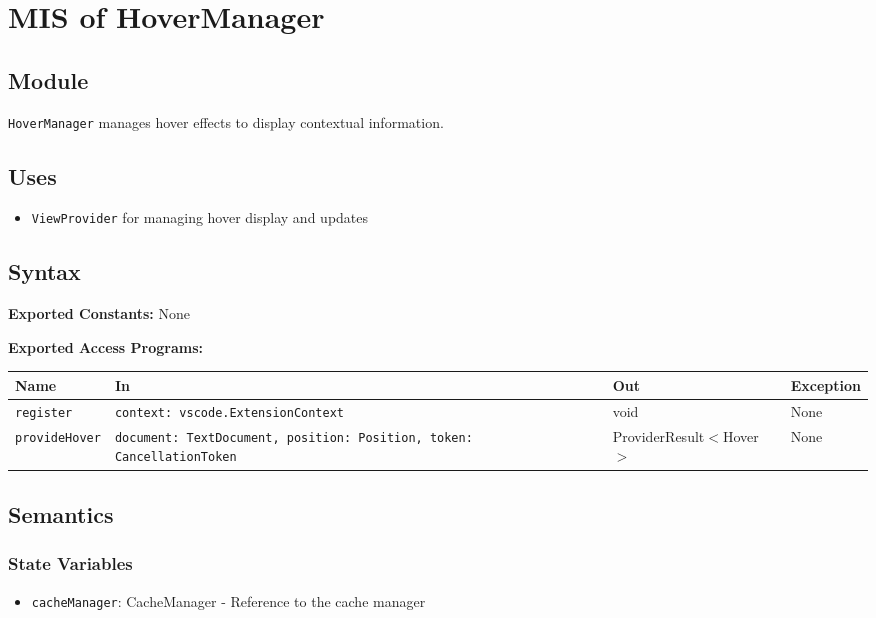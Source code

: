 \documentclass[12pt, titlepage]{article}
\begin{document}
\section{MIS of HoverManager}

\subsection{Module}
\texttt{HoverManager} manages hover effects to display contextual information.

\subsection{Uses}
\begin{itemize}
\item \texttt{ViewProvider} for managing hover display and updates
\end{itemize}

\subsection{Syntax}

\textbf{Exported Constants:} None

\textbf{Exported Access Programs:}\\
\begin{tabularx}{\linewidth}{|l|>{\raggedright\arraybackslash}X|l|l|}
  \hline
  \textbf{Name} & \textbf{In} & \textbf{Out} & \textbf{Exception} \\
  \hline
  \texttt{register} & \texttt{context: vscode.ExtensionContext} & void & None \\ \hline
  \texttt{provideHover} & \texttt{document: TextDocument, position: Position, token: CancellationToken} & ProviderResult$<$Hover$>$ & None \\
  \hline
\end{tabularx}

\subsection{Semantics}

\subsubsection{State Variables}
\begin{itemize}
\item \texttt{cacheManager}: CacheManager - Reference to the cache manager
\end{itemize}
\end{document}
